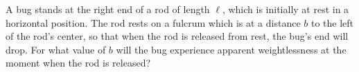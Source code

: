 A bug stands at the right end of a rod of length $\ell$, which is
initially at rest in a horizontal position. The rod rests on a fulcrum
which is at a distance $b$ to the left of the rod's center, so that
when the rod is released from rest, the bug's end will drop.
For what value of $b$ will the bug experience apparent
weightlessness at the moment when the rod is released?\answercheck

